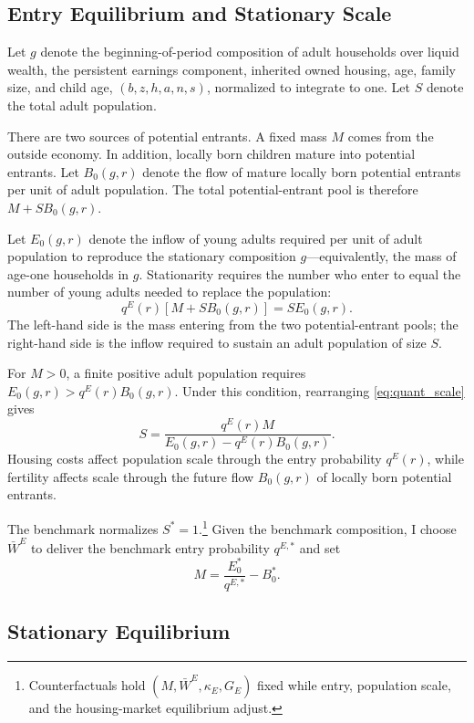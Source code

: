 \documentclass[11pt]{article}
\theoremstyle{definition}
\newcommand{\1}{\mathbf 1}
\begin{document}
\subsection{Entry Equilibrium and Stationary Scale}
\label{sec:quant_entry_scale}

Let $g$ denote the beginning-of-period composition of adult households over
liquid wealth, the persistent earnings component, inherited owned housing, age, family size, and
child age, $(b,z,h,a,n,s)$, normalized to integrate to one. Let $S$ denote the
total adult population.

There are two sources of potential entrants. A fixed mass $M$ comes from the
outside economy. In addition, locally born children mature into potential
entrants. Let $B_0(g,r)$ denote the flow of mature locally born potential
entrants per unit of adult population. The total potential-entrant pool is
therefore $M+S B_0(g,r)$.

Let $E_0(g,r)$ denote the inflow of young adults required per unit of adult
population to reproduce the stationary composition $g$---equivalently, the
mass of age-one households in $g$. Stationarity requires the number who enter
to equal the number of young adults needed to replace the population:
\begin{equation}
q^E(r)\left[M+S B_0(g,r)\right]
=S E_0(g,r).
\label{eq:quant_scale}
\end{equation}
The left-hand side is the mass entering from the two potential-entrant pools;
the right-hand side is the inflow required to sustain an adult population of
size $S$.

For $M>0$, a finite positive adult population requires
$E_0(g,r)>q^E(r)B_0(g,r)$. Under this condition, rearranging
\eqref{eq:quant_scale} gives
\begin{equation}
S
=
\frac{q^E(r)M}{E_0(g,r)-q^E(r)B_0(g,r)}.
\label{eq:quant_scale_solution}
\end{equation}
Housing costs affect population scale through the entry probability $q^E(r)$,
while fertility affects scale through the future flow $B_0(g,r)$ of locally
born potential entrants.

The benchmark normalizes $S^\ast=1$.\footnote{Counterfactuals hold
$(M,\bar W^E,\kappa_E,G_E)$ fixed while entry, population scale, and the
housing-market equilibrium adjust.} Given the benchmark composition, I choose
$\bar W^E$ to deliver the benchmark entry probability $q^{E,\ast}$ and set
\[
M=\frac{E_0^\ast}{q^{E,\ast}}-B_0^\ast.
\]

\subsection{Stationary Equilibrium}
\label{sec:quant_stationary_equilibrium}
\end{document}
